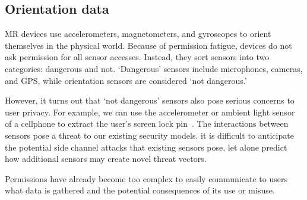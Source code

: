 \subsection{Orientation data}

MR devices use accelerometers, magnetometers, and gyroscopes to orient themselves in the physical world. Because of permission fatigue, devices do not ask permission for all sensor accesses. Instead, they sort sensors into two categories: dangerous and not. `Dangerous' sensors include microphones, cameras, and GPS, while orientation sensors are considered `not dangerous.'

However, it turns out that `not dangerous' sensors also pose serious concerns to user privacy. For example, we can use the accelerometer or ambient light sensor of a cellphone to extract the user's screen lock pin~\cite{aviv2012practicality, spreitzer2018systematic}. The interactions between sensors pose a threat to our existing security models. it is difficult to anticipate the potential side channel attacks that existing sensors pose, let alone predict how additional sensors may create novel threat vectors.

Permissions have already become too complex to easily communicate to users what data is gathered and the potential consequences of its use or misuse.


